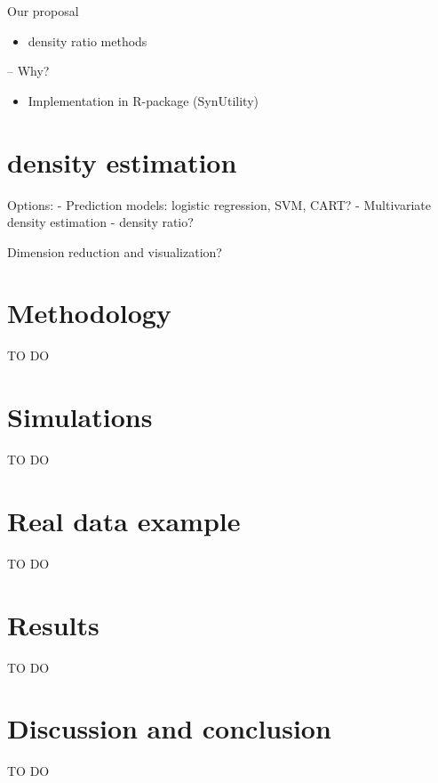 \documentclass{statsoc}
\providecommand{\tightlist}{%
  \setlength{\itemsep}{0pt}\setlength{\parskip}{0pt}}
\begin{document}
Our proposal

\begin{itemize}
\tightlist
\item
  density ratio methods
\end{itemize}

-- Why?

\begin{itemize}
\tightlist
\item
  Implementation in R-package (SynUtility)
\end{itemize}

\hypertarget{density-estimation}{%
\section{density estimation}\label{density-estimation}}

Options: - Prediction models: logistic regression, SVM, CART? -
Multivariate density estimation - density ratio?

Dimension reduction and visualization?

\hypertarget{methodology}{%
\section{Methodology}\label{methodology}}

TO DO

\hypertarget{simulations}{%
\section{Simulations}\label{simulations}}

TO DO

\hypertarget{real-data-example}{%
\section{Real data example}\label{real-data-example}}

TO DO

\hypertarget{results}{%
\section{Results}\label{results}}

TO DO

\hypertarget{discussion-and-conclusion}{%
\section{Discussion and conclusion}\label{discussion-and-conclusion}}

TO DO



\end{document}
